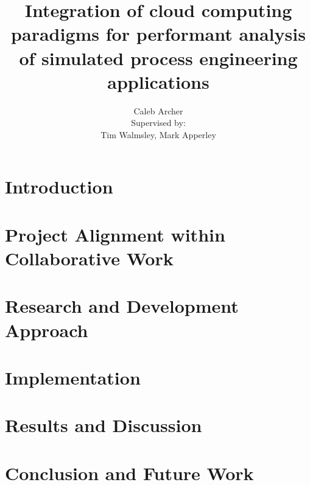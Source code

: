 \documentclass[12pt,a4paper]{uwthesis17}
\title{Integration of cloud computing paradigms for performant analysis of simulated process engineering applications}
\author{
  Caleb Archer \\
  Supervised by: \\
  Tim Walmsley, Mark Apperley
}
\begin{document}

\maketitle

\setcounter{page}{2}

\begin{abstract}

\end{abstract}

\begin{acknowledgements}

\end{acknowledgements}

\begin{authorship-declaration}

\end{authorship-declaration}

\tableofcontents

\listoffigures

\listoftables

\newpage

\setcounter{page}{1}

\chapter{Introduction}
\label{sec:intro}



\chapter{Project Alignment within Collaborative Work}

\chapter{Research and Development Approach}



\chapter{Implementation}



\chapter{Results and Discussion}



\chapter{Conclusion and Future Work}


 

\end{document}
